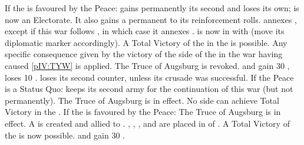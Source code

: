 \begin{digressions}


  \aparag If the \ligue is favoured by the Peace:
  \bparag \paysBaviere gains permanently its second \ARMY and \paysPalatinat
  loses its own; \paysBaviere is now an Electorate.  It also gains a permanent
   to its reinforcement rolls.
  \bparag \paysBaviere annexes \provinceOberPfalz, except if this war follows
  , in which case it annexes
  \provinceSchwaben.
  \bparag \paysBaviere is now in \AM with \HAB (move its diplomatic marker
  accordingly).
  \bparag A Total Victory of the \ligue in the  is possible.
  \bparag Any specific consequence given by the victory of the side of the
  \ligue in the war having caused \ref{pIV:TYW} is applied.
  \bparag The Truce of Augsburg is revoked.
  \bparag \SPA and \AUS gain 30 \PV, \SUE loses 10 \PV.
  \bparag \DANdan loses its second \ARMY counter, unless its crusade was
  successful.
  \aparag If the Peace is a Status Quo:
  \bparag \paysBaviere keeps its second army for the continuation of this war
  (but not permanently).
  \bparag The Truce of Augsburg is in effect.
  \bparag No side can achieve Total Victory in the .
  \aparag If the \alliance is favoured by the Peace:
  \bparag The Truce of Augsburg is in effect.
  \bparag A  is created and allied to
  \HOL.
  \bparag \paysOldenburg, \paysHanovre, \paysHesse, \paysHanse and \paysBerg
  are placed in \EG of \HOL.
  \bparag A Total Victory of the \alliance is now possible.
  \bparag \HOL and \SUE gain 30 \PV.



\end{digressions}
